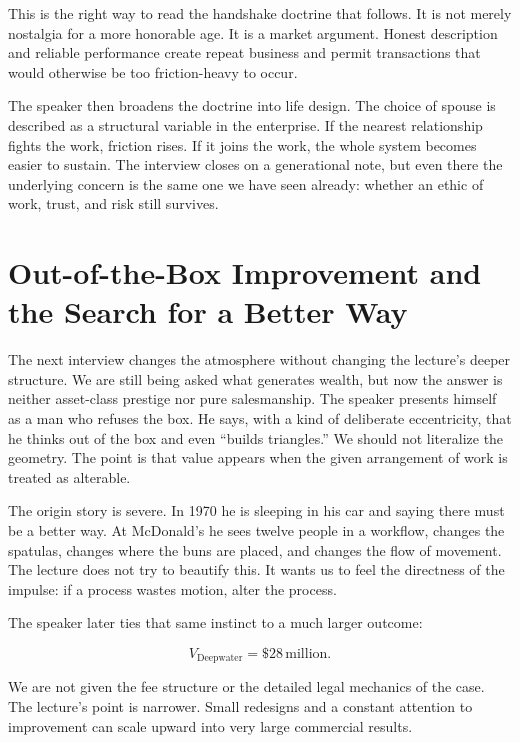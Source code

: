This is the right way to read the handshake doctrine that follows. It is not merely nostalgia for a more honorable age. It is a market argument. Honest description and reliable performance create repeat business and permit transactions that would otherwise be too friction-heavy to occur.

The speaker then broadens the doctrine into life design. The choice of spouse is described as a structural variable in the enterprise. If the nearest relationship fights the work, friction rises. If it joins the work, the whole system becomes easier to sustain. The interview closes on a generational note, but even there the underlying concern is the same one we have seen already: whether an ethic of work, trust, and risk still survives.

\section{Out-of-the-Box Improvement and the Search for a Better Way}

The next interview changes the atmosphere without changing the lecture's deeper structure. We are still being asked what generates wealth, but now the answer is neither asset-class prestige nor pure salesmanship. The speaker presents himself as a man who refuses the box. He says, with a kind of deliberate eccentricity, that he thinks out of the box and even ``builds triangles.'' We should not literalize the geometry. The point is that value appears when the given arrangement of work is treated as alterable.

The origin story is severe. In 1970 he is sleeping in his car and saying there must be a better way. At McDonald's he sees twelve people in a workflow, changes the spatulas, changes where the buns are placed, and changes the flow of movement. The lecture does not try to beautify this. It wants us to feel the directness of the impulse: if a process wastes motion, alter the process.

The speaker later ties that same instinct to a much larger outcome:

\begin{equation}
V_{\text{Deepwater}}=\$28\,\text{million}.
\end{equation}

We are not given the fee structure or the detailed legal mechanics of the case. The lecture's point is narrower. Small redesigns and a constant attention to improvement can scale upward into very large commercial results.

